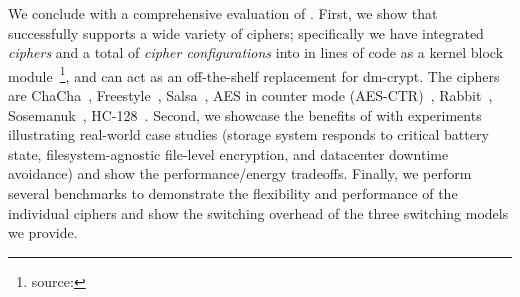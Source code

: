We conclude with a comprehensive evaluation of \sys.
%
First, we show that \sys successfully supports a wide variety of ciphers;
specifically we have integrated {\em \numCiphers ciphers} and a total of {\em
\numConfigs cipher configurations} into \sys in \locTotal lines of code as a
kernel block module~\footnote{\label{ftn:foss}\sys source: \sysURI}, and can act
as an off-the-shelf replacement for dm-crypt. The ciphers are
ChaCha~\cite{ChaCha20}, Freestyle~\cite{Freestyle}, Salsa~\cite{SalsaX}, AES in
counter mode (AES-CTR)~\cite{AESCTR}, Rabbit~\cite{Rabbit},
Sosemanuk~\cite{Sosemanuk}, HC-128~\cite{HC128}.
%
Second, we showcase the benefits of \sys with experiments illustrating \numCases
real-world case studies (\ie storage system responds to critical battery state,
filesystem-agnostic file-level encryption, and datacenter downtime avoidance)
and show the performance/energy tradeoffs.
%
Finally, we perform several benchmarks to demonstrate the flexibility and
performance of the individual ciphers and show the switching overhead of the
three switching models we provide.
